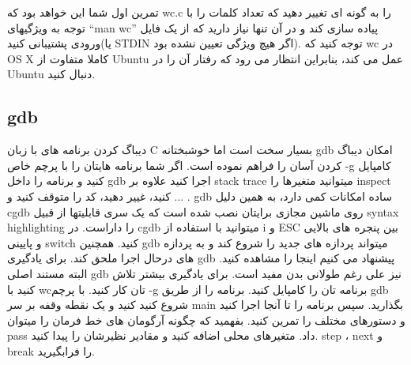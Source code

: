 تمرین اول شما این خواهد بود که wc.c را به گونه ای تغییر دهید که تعداد کلمات را با توجه به ویژگیهای “man wc” پیاده سازی کند و در آن تنها نیاز دارید که از یک فایل ورودی پشتیبانی کنید(یا STDIN اگر هیچ ویژگی تعیین نشده بود).
توجه کنید که wc در OS X کاملا متفاوت از Ubuntu عمل می کند، بنابراین انتظار می رود که رفتار آن را در Ubuntu دنبال کنید.

\subsection{gdb}
دیباگ کردن برنامه های با زبان C بسیار سخت است اما خوشبختانه gdb امکان دیباگ کردن آسان را فراهم نموده است. اگر شما برنامه هایتان را با پرچم خاص -g کامپایل کنید و برنامه را داخل gdb اجرا کنید علاوه بر stack trace میتوانید متغیرها را inspect کنید، غییر دهید، کد را متوقف کنید و ... .
gdb ساده امکانات کمی دارد، به همین دلیل cgdb روی ماشین مجازی برایتان نصب شده است که یک سری قابلیتها از قبیل syntax highlighting را داراست. در cgdb میتوانید با استفاده از i و ESC بین پنجره های بالایی و پایینی switch کنید.
همچنین gdb میتواند پردازه های جدید را شروع کند و به پردازه های درحال اجرا ملحق کند.
برای یادگیری gdb پیشنهاد می کنیم اینجا را مشاهده کنید. البته مستند اصلی gdb نیز علی رغم طولانی بدن مفید است.
برای یادگیری بیشتر تلاش کنید با wcتان کار کنید. با پرچم -g برنامه تان را کامپایل کنید. برنامه را از طریق gdb شروع کنید کنید و یک نقطه وقفه بر سر main بگذارید. سپس برنامه را تا آنجا اجرا کنید و دستورهای مختلف را تمرین کنید. بفهمید که چگونه آرگومان های خط فرمان را میتوان pass داد. متغیرهای محلی اضافه کنید و مقادیر نظیرشان را پیدا کنید. step ، next و break را فرابگیرید.

